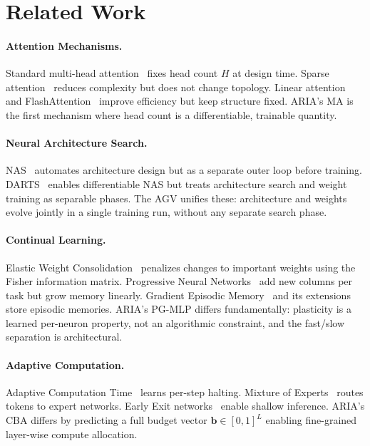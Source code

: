 \documentclass[11pt,a4paper]{article}
\theoremstyle{plain}
\theoremstyle{definition}
\theoremstyle{remark}
\begin{document}
\section{Related Work}

\paragraph{Attention Mechanisms.}
Standard multi-head attention~\citep{vaswani2017} fixes head count $H$ at design time. Sparse attention~\citep{child2019, zaheer2020} reduces complexity but does not change topology. Linear attention~\citep{katharopoulos2020} and FlashAttention~\citep{dao2022} improve efficiency but keep structure fixed. ARIA's MA is the first mechanism where head count is a differentiable, trainable quantity.

\paragraph{Neural Architecture Search.}
NAS~\citep{zoph2017, real2019} automates architecture design but as a separate outer loop before training. DARTS~\citep{liu2019} enables differentiable NAS but treats architecture search and weight training as separable phases. The AGV unifies these: architecture and weights evolve jointly in a single training run, without any separate search phase.

\paragraph{Continual Learning.}
Elastic Weight Consolidation~\citep{kirkpatrick2017} penalizes changes to important weights using the Fisher information matrix. Progressive Neural Networks~\citep{rusu2016} add new columns per task but grow memory linearly. Gradient Episodic Memory~\citep{lopezpaz2017} and its extensions~\citep{chaudhry2019} store episodic memories. ARIA's PG-MLP differs fundamentally: plasticity is a learned per-neuron property, not an algorithmic constraint, and the fast/slow separation is architectural.

\paragraph{Adaptive Computation.}
Adaptive Computation Time~\citep{graves2016} learns per-step halting. Mixture of Experts~\citep{shazeer2017} routes tokens to expert networks. Early Exit networks~\citep{teerapittayanon2016} enable shallow inference. ARIA's CBA differs by predicting a full budget vector $\mathbf{b} \in [0,1]^L$ enabling fine-grained layer-wise compute allocation.
\end{document}

